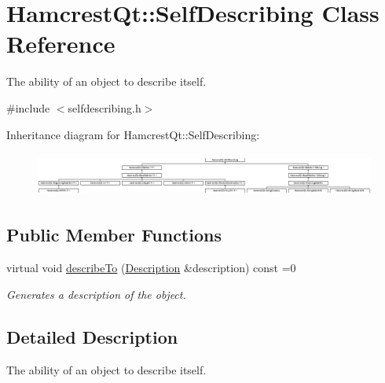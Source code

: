 \hypertarget{class_hamcrest_qt_1_1_self_describing}{\section{Hamcrest\-Qt\-:\-:Self\-Describing Class Reference}
\label{class_hamcrest_qt_1_1_self_describing}
}


The ability of an object to describe itself.  




{\ttfamily \#include $<$selfdescribing.\-h$>$}

Inheritance diagram for Hamcrest\-Qt\-:\-:Self\-Describing\-:\begin{figure}[H]
\begin{center}
\leavevmode
\includegraphics[height=1.464435cm]{class_hamcrest_qt_1_1_self_describing}
\end{center}
\end{figure}
\subsection*{Public Member Functions}
\begin{DoxyCompactItemize}
\item 
virtual void \hyperlink{class_hamcrest_qt_1_1_self_describing_af04da98570148e5e943e42399f718e4c}{describe\-To} (\hyperlink{class_hamcrest_qt_1_1_description}{Description} \&description) const =0
\begin{DoxyCompactList}\small\item\em Generates a description of the object. \end{DoxyCompactList}\end{DoxyCompactItemize}


\subsection{Detailed Description}
The ability of an object to describe itself. 

